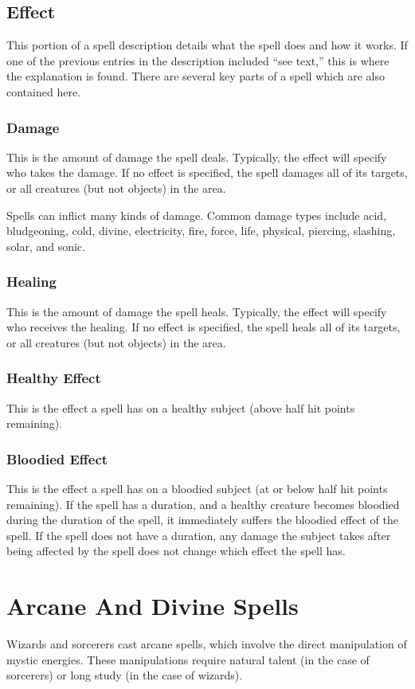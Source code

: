 \subsection{Effect}
This portion of a spell description details what the spell does and how it works. If one of the previous entries in the description included ``see text,'' this is where the explanation is found. There are several key parts of a spell which are also contained here.

\subsubsection{Damage}
This is the amount of damage the spell deals. Typically, the effect will specify who takes the damage. If no effect is specified, the spell damages all of its targets, or all creatures (but not objects) in the area.

Spells can inflict many kinds of damage. Common damage types include acid, bludgeoning, cold, divine, electricity, fire, force, life, physical, piercing, slashing, solar, and sonic.

\subsubsection{Healing}
This is the amount of damage the spell heals. Typically, the effect will specify who receives the healing. If no effect is specified, the spell heals all of its targets, or all creatures (but not objects) in the area.

\subsubsection{Healthy Effect}
This is the effect a spell has on a healthy subject (above half hit points remaining).

\subsubsection{Bloodied Effect}
This is the effect a spell has on a bloodied subject (at or below half hit points remaining). If the spell has a duration, and a healthy creature becomes bloodied during the duration of the spell, it immediately suffers the bloodied effect of the spell. If the spell does not have a duration, any damage the subject takes after being affected by the spell does not change which effect the spell has.

\section{Arcane And Divine Spells}
Wizards and sorcerers cast arcane spells, which involve the direct manipulation of mystic energies. These manipulations require natural talent (in the case of sorcerers) or long study (in the case of wizards).

